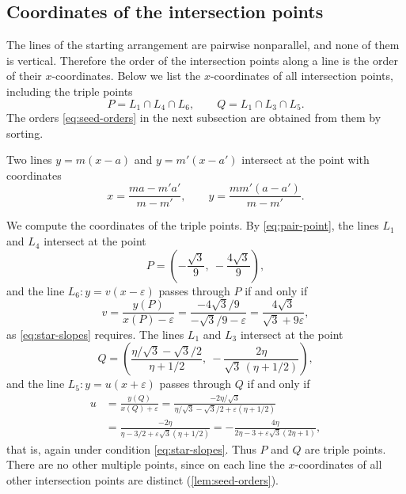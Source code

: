 \subsection{Coordinates of the intersection points}

The lines of the starting arrangement are pairwise nonparallel, and none of them is vertical. Therefore the order of the intersection points along a line is the order of their $x$-coordinates. Below we list the $x$-coordinates of all intersection points, including the triple points
\[
P=L_1\cap L_4\cap L_6,
\qquad
Q=L_1\cap L_3\cap L_5.
\]
The orders \eqref{eq:seed-orders} in the next subsection are obtained from them by sorting.

Two lines $y=m(x-a)$ and $y=m'(x-a')$ intersect at the point with coordinates
\begin{equation}\label{eq:pair-point}
x=\frac{ma-m'a'}{m-m'} ,
\qquad
y=\frac{mm'(a-a')}{m-m'} .
\end{equation}

We compute the coordinates of the triple points. By \eqref{eq:pair-point}, the lines $L_1$ and $L_4$ intersect at the point
\[
P=\left(-\frac{\sqrt3}9,\ -\frac{4\sqrt3}9\right),
\]
and the line $L_6:y=v(x-\varepsilon)$ passes through $P$ if and only if
\[
v=\frac{y(P)}{x(P)-\varepsilon}=\frac{-4\sqrt3/9}{-\sqrt3/9-\varepsilon}=\frac{4\sqrt3}{\sqrt3+9\varepsilon} ,
\]
as \eqref{eq:star-slopes} requires.
The lines $L_1$ and $L_3$ intersect at the point
\begin{equation}\label{eq:Q-coords}
Q=\left(\frac{\eta/\sqrt3-\sqrt3/2}{\eta+1/2},\
-\frac{2\eta}{\sqrt3\,(\eta+1/2)}\right),
\end{equation}
and the line $L_5:y=u(x+\varepsilon)$ passes through $Q$ if and only if
\[
\begin{aligned}
u&=\frac{y(Q)}{x(Q)+\varepsilon}
=\frac{-2\eta/\sqrt3}{\eta/\sqrt3-\sqrt3/2+\varepsilon(\eta+1/2)}\\
&=\frac{-2\eta}{\eta-3/2+\varepsilon\sqrt3(\eta+1/2)}
=-\frac{4\eta}{2\eta-3+\varepsilon\sqrt3(2\eta+1)} ,
\end{aligned}
\]
that is, again under condition \eqref{eq:star-slopes}.
Thus $P$ and $Q$ are triple points. There are no other multiple points, since on each line the $x$-coordinates of all other intersection points are distinct (\cref{lem:seed-orders}).

